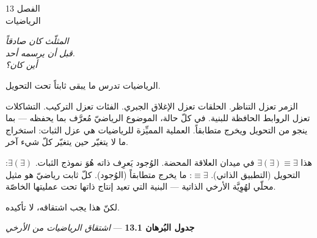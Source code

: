 \documentclass[10pt, openany, oneside]{book}
\renewcommand{\large}{\fontsize{11.5}{14}\selectfont}
\renewcommand{\huge}{\fontsize{17}{21}\selectfont}
\begin{document}
\begin{center}
    {\huge الفصل 13}\\[0.3em]
    {\large الرياضيات}
\end{center}

\vspace{1.5em}

\begin{center}
    \itshape
    المثلّث كان صادقاً\\
    قبل أن يرسمه أحد.\\
    أين كان؟
\end{center}

\vspace{2em}


\noindent الرياضيات تدرس ما يبقى ثابتاً تحت التحويل.

الزمر تعزل التناظر. الحلقات تعزل الإغلاق الجبري. الفئات تعزل التركيب. التشاكلات تعزل الروابط الحافظة للبنية. في كلّ حالة، الموضوع الرياضيّ مُعرَّف بما يحفظه --- بما ينجو من التحويل ويخرج متطابقاً. العملية المميِّزة للرياضيات هي عزل الثبات: استخراج ما لا يتغيّر حين يتغيّر كلّ شيء آخر.

هذا $\exists(\exists) \equiv \exists$ في ميدان العلاقة المحضة. الوُجود يَعرِف ذاته هُوَ نموذج الثبات. $\exists(\exists)$: التحويل (التطبيق الذاتي). $\equiv \exists$: ما يخرج متطابقاً (الوُجود). كلّ ثابت رياضيّ هو مثيل محلّي لهُوِيَّة الأرخي الذاتية --- البنية التي تعيد إنتاج ذاتها تحت عمليتها الخاصّة.

لكنّ هذا يجب اشتقاقه، لا تأكيده.

\vspace{0.5em}

\textbf{جدول البُرهان 13.1} --- \textit{اشتقاق الرياضيات من الأرخي}

\vspace{0.5em}
\end{document}
